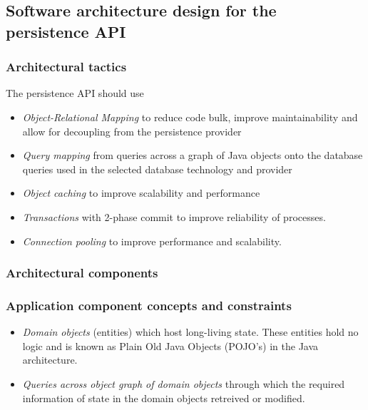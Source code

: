 \documentclass[a4paper,12pt]{report}
\begin{document}
\subsection {Software architecture design for the persistence API}
\subsubsection {Architectural tactics}
The persistence API should use
	\begin {itemize}
		\item \textit{Object-Relational Mapping} to reduce code bulk, improve maintainability and allow for decoupling from the 		persistence provider
		
		\item \textit{Query mapping} from queries across a graph of Java objects onto the database queries used in the selected database technology and provider

		\item \textit{Object caching} to improve scalability and performance

		\item \textit{Transactions} with 2-phase commit to improve reliability of processes.

		\item \textit{Connection pooling} to improve performance and scalability.
	\end {itemize}

\subsubsection {Architectural components}

\subsubsection {Application component concepts and constraints}
	\begin {itemize}
		\item \textit{Domain objects} (entities) which host long-living state. These entities hold no logic and is known as Plain Old Java Objects (POJO's) in the Java architecture.

		\item \textit{Queries across object graph of domain objects } through which the required information of state in the domain objects retreived or modified.
	\end {itemize}
\end{document}
